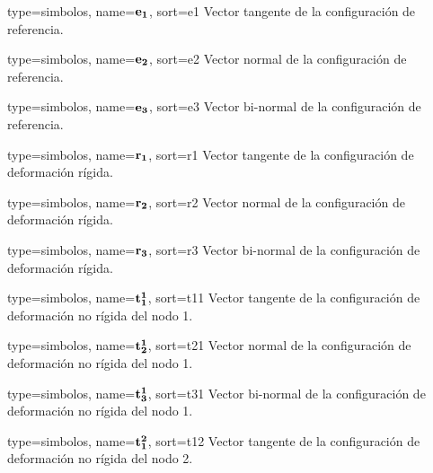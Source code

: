 {
	type={simbolos},
	name={$\bf{e_1}$}, %
	sort={e1} %
}
{Vector tangente de la configuración de referencia.}

{
	type={simbolos},
name={$\bf{e_2}$}, %
	sort={e2} %
}
{Vector normal de la configuración de referencia.}

{
	type={simbolos},
	name={$\bf{e_3}$}, %
	sort={e3} %
}
{Vector bi-normal de la configuración de referencia.}


{
	type={simbolos},
	name={$\bf{r_1}$}, %
	sort={r1} %
}
{Vector tangente de la configuración de deformación rígida.}

{
	type={simbolos},
	name={$\bf{r_2}$}, %
	sort={r2} %
}
{Vector normal de la configuración de deformación rígida.}

{
	type={simbolos},
	name={$\bf{r_3}$}, %
	sort={r3} %
}
{Vector bi-normal de la configuración de deformación rígida.}

{
	type={simbolos},
	name={$\bf{t_1^1}$}, %
	sort={t11} %
}
{Vector tangente de la configuración de deformación no rígida del nodo 1.}

{
	type={simbolos},
	name={$\bf{t_2^1}$}, %
	sort={t21} %
}
{Vector normal de la configuración de deformación no rígida del nodo 1.}

{
	type={simbolos},
	name={$\bf{t_3^1}$}, %
	sort={t31} %
}
{Vector bi-normal de la configuración de deformación no rígida del nodo 1.}

{
	type={simbolos},
	name={$\bf{t_1^2}$}, %
	sort={t12} %
}
{Vector tangente de la configuración de deformación no rígida del nodo 2.}

